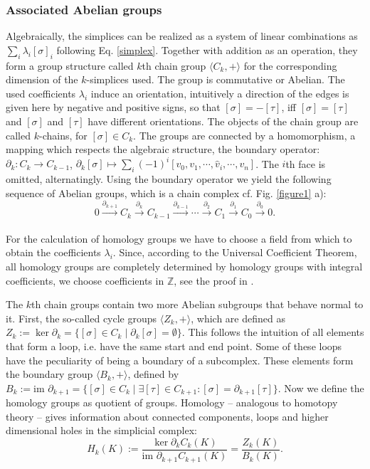 \documentclass[runningheads,orivec]{llncs}
\begin{document}
\subsubsection{Associated Abelian groups} Algebraically, the simplices can be realized as a system of linear combinations as $\sum_i \lambda_i [\sigma]_{i}$ following Eq. \ref{simplex}. Together with addition as an operation, they form a group structure called $k$th chain group $\langle C_k, +\rangle$ for the corresponding dimension of the $k$-simplices used. The group is commutative or Abelian. The used coefficients $\lambda_i$ induce an orientation, intuitively a direction of the edges is given here by negative and positive signs, so that $[\sigma] = -[\tau]$, iff $[\sigma] = [\tau]$ and $[\sigma]$ and $[\tau]$ have different orientations. The objects of the chain group are called $k$-chains, for $[\sigma] \in C_k$. The groups are connected by a homomorphism, a mapping which respects the algebraic structure, the boundary operator: $\partial_k: C_k \rightarrow C_{k-1}$, $\partial_k [\sigma] \mapsto \sum_i (-1)^i [v_0,v_1,\cdots,\hat{v}_i, \cdots, v_n]$. The $i$th face is omitted, alternatingly. Using the boundary operator we yield the following sequence of Abelian groups, which is a chain complex cf. Fig. \ref{figure1} a):
\begin{equation}
    0 \xrightarrow[]{\partial_{k+1}} C_k \xrightarrow[]{\partial_{k}} C_{k-1} \xrightarrow[]{\partial_{k-1}} \cdots \xrightarrow[]{\partial_{2}} C_1 \xrightarrow[]{\partial_{1}} C_0 \xrightarrow[]{\partial_{0}} 0.
\end{equation}

For the calculation of homology groups we have to choose a field from which to obtain the coefficients $\lambda_i$. Since, according to the Universal Coefficient Theorem, all homology groups are completely determined by homology groups with integral coefficients, we choose coefficients in $\mathbb{Z}$, see the proof in \cite{gruenberg1968universal}.

The $k$th chain groups contain two more Abelian subgroups that behave normal to it. First, the so-called cycle groups $\langle Z_k, +\rangle$, which are defined as $Z_k := \ker \partial_k = \{[\sigma] \in C_k \; \vert \; \partial_k [\sigma] = \emptyset \}$. This follows the intuition of all elements that form a loop, i.e. have the same start and end point. Some of these loops have the peculiarity of being a boundary of a subcomplex. These elements form the boundary group $\langle B_k, +\rangle$, defined by $B_k := \text{im } \partial_{k+1} = \{[\sigma] \in C_k \; \vert \; \exists [\tau] \in C_{k+1}: [\sigma] = \partial_{k+1}[\tau]\}$. Now we define the homology groups as quotient of groups. Homology -- analogous to homotopy theory -- gives information about connected components, loops and higher dimensional holes in the simplicial complex:
\begin{equation}
    H_k(K) := \frac{\ker \partial_k C_k(K)}{\text{im } \partial_{k+1} C_{k+1}(K)} = \frac{Z_k(K)}{B_k(K)}.
\end{equation}
\end{document}
